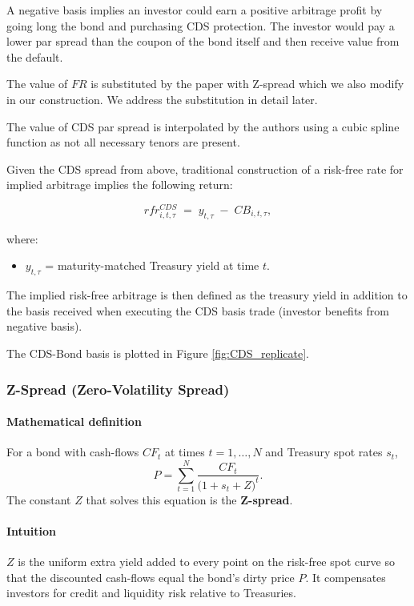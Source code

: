 \documentclass{article}
\begin{document}
\begin{appendices}
A negative basis implies an investor could earn a positive arbitrage profit by going long the bond and purchasing CDS protection. 
The investor would pay a lower par spread than the coupon of the bond itself and then receive value from the default.

The value of $FR$ is substituted by the paper with Z-spread which we also modify in our construction. We address the substitution in detail later.

The value of CDS par spread is interpolated by the authors using a cubic spline function as
not all necessary tenors are present.

Given the CDS spread from above, traditional construction of a risk-free rate for implied arbitrage implies the following return:

\begin{equation}
  rfr^{CDS}_{i,t,\tau} \;=\; y_{t,\tau} \;-\; CB_{i,t,\tau},
\end{equation}

where:
\begin{itemize}
  \item $y_{t,\tau}$ = maturity-matched Treasury yield at time $t$.
\end{itemize}

The implied risk-free arbitrage is then defined as the treasury yield in addition to the basis received when executing the CDS basis trade (investor benefits from negative basis).

The CDS-Bond basis is plotted in Figure \ref{fig:CDS_replicate}.    

\subsubsection{Z-Spread (Zero-Volatility Spread)}

\paragraph*{Mathematical definition}
For a bond with cash-flows $CF_t$ at times $t=1,\dots,N$ and Treasury spot rates $s_t$,
\begin{equation*}
P = \sum_{t=1}^{N} \frac{CF_t}{\bigl(1+s_t+Z\bigr)^t}.
\end{equation*}
The constant $Z$ that solves this equation is the \textbf{Z-spread}.

\paragraph*{Intuition}
$Z$ is the uniform extra yield added to every point on the risk-free spot curve so that the discounted cash-flows equal the bond's dirty price $P$. It compensates investors for credit and liquidity risk relative to Treasuries.


\end{appendices}
\end{document}
